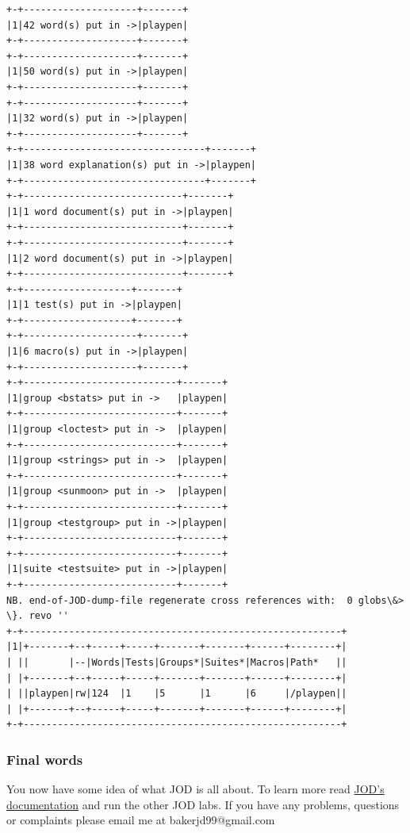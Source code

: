\documentclass[11pt,letter,landscape]{article}
\begin{document}
    \begin{Verbatim}[commandchars=\\\{\}]
+-+--------------------+-------+
|1|42 word(s) put in ->|playpen|
+-+--------------------+-------+
+-+--------------------+-------+
|1|50 word(s) put in ->|playpen|
+-+--------------------+-------+
+-+--------------------+-------+
|1|32 word(s) put in ->|playpen|
+-+--------------------+-------+
+-+--------------------------------+-------+
|1|38 word explanation(s) put in ->|playpen|
+-+--------------------------------+-------+
+-+----------------------------+-------+
|1|1 word document(s) put in ->|playpen|
+-+----------------------------+-------+
+-+----------------------------+-------+
|1|2 word document(s) put in ->|playpen|
+-+----------------------------+-------+
+-+-------------------+-------+
|1|1 test(s) put in ->|playpen|
+-+-------------------+-------+
+-+--------------------+-------+
|1|6 macro(s) put in ->|playpen|
+-+--------------------+-------+
+-+---------------------------+-------+
|1|group <bstats> put in ->   |playpen|
+-+---------------------------+-------+
|1|group <loctest> put in ->  |playpen|
+-+---------------------------+-------+
|1|group <strings> put in ->  |playpen|
+-+---------------------------+-------+
|1|group <sunmoon> put in ->  |playpen|
+-+---------------------------+-------+
|1|group <testgroup> put in ->|playpen|
+-+---------------------------+-------+
+-+---------------------------+-------+
|1|suite <testsuite> put in ->|playpen|
+-+---------------------------+-------+
NB. end-of-JOD-dump-file regenerate cross references with:  0 globs\&> \}. revo '' 
+-+--------------------------------------------------------+
|1|+-------+--+-----+-----+-------+-------+------+--------+|
| ||       |--|Words|Tests|Groups*|Suites*|Macros|Path*   ||
| |+-------+--+-----+-----+-------+-------+------+--------+|
| ||playpen|rw|124  |1    |5      |1      |6     |/playpen||
| |+-------+--+-----+-----+-------+-------+------+--------+|
+-+--------------------------------------------------------+

    \end{Verbatim}

    \subsubsection{Final words}\label{final-words}

You now have some idea of what JOD is all about. To learn more read
\href{https://github.com/jsoftware/general_joddocument/blob/master/pdfdoc/jod.pdf}{JOD's
documentation} and run the other JOD labs. If you have any problems,
questions or complaints please email me at bakerjd99@gmail.com
\end{document}
